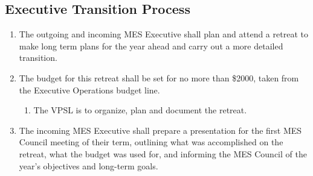 \subsection{Executive Transition
 Process}
\label{executive-transition-process}
\begin{enumerate}
 \item
  The outgoing and incoming MES Executive shall plan and attend a
  retreat to make long term plans for the year ahead and carry out a
  more detailed transition.
 \item
  The budget for this retreat shall be set for no more than \$2000,
  taken from the Executive Operations budget line.

  \begin{enumerate}
   \item
    The VPSL is to organize, plan and document the retreat.
  \end{enumerate}
 \item
  The incoming MES Executive shall prepare a presentation for the first
  MES Council meeting of their term, outlining what was accomplished on
  the retreat, what the budget was used for, and informing the MES
  Council of the year's objectives and long-term goals.
\end{enumerate}

